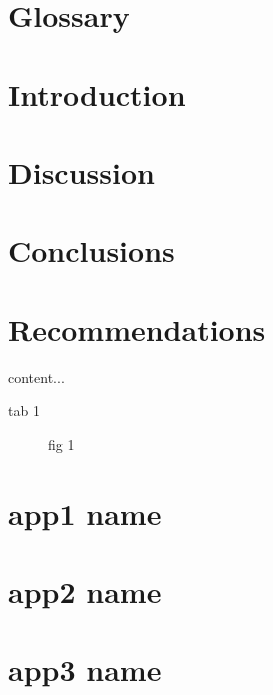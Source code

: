 \documentclass[12pt]{article}
\begin{document}
\pagebreak

\section*{Glossary} 

\newpage



\section{Introduction}



\section{Discussion}




\section{Conclusions}

\section{Recommendations}


	\begin{table} [h]
		content...
		\caption{tab 1}
	\end{table}

	\begin{figure} [h]
		\caption{fig 1}
	\end{figure}
	
\pagebreak

\begin{appendices}


\cfoot{\thesection-\thepage}

\section{app1 name}

\pagebreak
\section{app2 name}

\pagebreak
\section{app3 name}




\pagebreak

\end{appendices}
\end{document}
